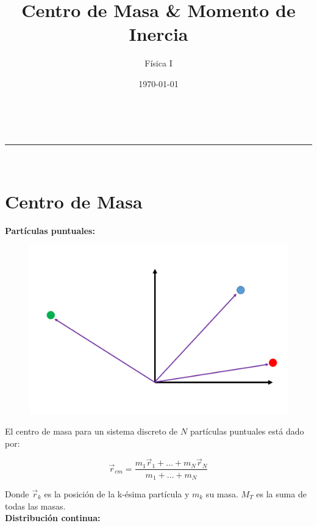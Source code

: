 \documentclass[a4paper,11pt]{article}
\makeatletter
\newcommand{\linia}{\rule{\linewidth}{0.5pt}}
\renewcommand{\maketitle}{
\begin{center}
\vspace{2ex}
{\huge \textsc{\@title}}
\vspace{1ex}
\\
\linia\\
\@author \hfill \@date
\vspace{4ex}
\end{center}
}
\makeatother
\begin{document}
\title{ Centro de Masa \& Momento de Inercia}

\author{Física I}

\date{\today}

\maketitle
\tableofcontents
\setlength\intextsep{-15pt}


\section{Centro de Masa}

\textbf{Partículas puntuales:}


\begin{figure}
	\includegraphics[scale=0.5]{./im/masaspuntuales}
\end{figure}
El centro de masa para un sistema discreto de $N$ partículas puntuales  está dado por:

\begin{equation}
 \vec{r}_{cm}  = \frac{m_1\vec{r}_1 + \dots + m_N \vec{r}_N}{m_1 + \dots + m_N}
\end{equation}

Donde $ \vec{r}_k$ es la posición de la k-ésima partícula y $m_k$ su masa. $M_T$ es la suma de todas las masas.\\

\textbf{Distribución continua:}
\end{document}
